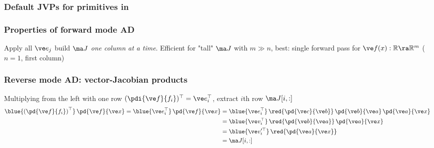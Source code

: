 \documentclass[fleqn,10pt]{beamer}
\begin{document}
\begin{frame}
    \frametitle{Default JVPs for \numpy primitives in \jax}
\end{frame}

\begin{frame}
    \frametitle{Properties of forward mode AD}
    Apply all $\ve e_j$ \ra build $\ma J$ \emph{one column at a time}.
    Efficient for "tall" $\ma J$ with $m\gg n$, best: single forward pass for $\ve f(x): \mathbb R \ra \mathbb R^m$ ($n=1$, first column)
    \edgecol
\end{frame}

\begin{frame}
    \frametitle{Reverse mode AD: vector-Jacobian products}
    Multiplying from the left with one row $(\pdi{\ve f}{f_i})^\top = \ve e_i^\top$, extract $i$th row $\ma J[i,:]$
    \begin{align*}
        \blue{\left(\pd{\ve f}{f_i}\right)^\top}\,\pd{\ve f}{\ve x} = \blue{\ve e_i^\top}\,\pd{\ve f}{\ve x}
            &= \blue{\ve e_i^\top}\,\red{\pd{\ve c}{\ve b}}\,\pd{\ve b}{\ve a}\,\pd{\ve a}{\ve x}\\
            &= \blue{\ve v_i^\top}\,\red{\pd{\ve b}{\ve a}}\,\pd{\ve a}{\ve x}\\
            &= \blue{\ve v_i'^\top}\,\red{\pd{\ve a}{\ve x}}\\
            &= \ma J[i,:]
    \end{align*}
\end{frame}
\end{document}
